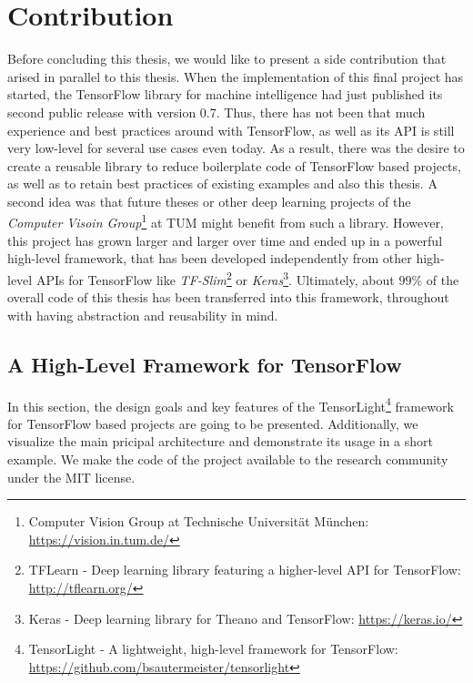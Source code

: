 

\chapter{Contribution} \label{chapter:contribution}

Before concluding this thesis, we would like to present a side contribution that arised in parallel to this thesis. When the implementation of this final project has started, the TensorFlow library for machine intelligence had just published its second public release with version \num{0.7}. Thus, there has not been that much experience and best practices around with TensorFlow, as well as its API is still very low-level for several use cases even today. As a result, there was the desire to create a reusable library to reduce boilerplate code of TensorFlow based projects, as well as to retain best practices of existing examples and also this thesis. A second idea was that future theses or other deep learning projects of the \textit{Computer Visoin Group}\footnote{Computer Vision Group at Technische Universität München: \url{https://vision.in.tum.de/}} at TUM might benefit from such a library. However, this project has grown larger and larger over time and ended up in a powerful high-level framework, that has been developed independently from other high-level APIs for TensorFlow like \textit{TF-Slim}\footnote{TFLearn - Deep learning library featuring a higher-level API for TensorFlow: \url{http://tflearn.org/}} or \textit{Keras}\footnote{Keras - Deep learning library for Theano and TensorFlow: \url{https://keras.io/}}. Ultimately, about $ 99\% $ of the overall code of this thesis has been transferred into this framework, throughout with having abstraction and reusability in mind.

\section{A High-Level Framework for TensorFlow}

In this section, the design goals and key features of the TensorLight\footnote{TensorLight - A lightweight, high-level framework for TensorFlow:\\ \url{https://github.com/bsautermeister/tensorlight}} framework for TensorFlow based projects are going to be presented. Additionally, we visualize the main pricipal architecture and demonstrate its usage in a short example. We make the code of the project available to the research community under the MIT license.

